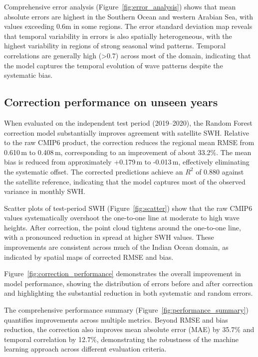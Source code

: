 \documentclass[twocolumn]{article}
\newcommand{\SI}[2]{#1\,#2}
\begin{document}
 Comprehensive error analysis (Figure~\ref{fig:error_analysis}) shows that mean absolute errors are highest in the Southern Ocean and western Arabian Sea, with values exceeding 0.6m in some regions. The error standard deviation map reveals that temporal variability in errors is also spatially heterogeneous, with the highest variability in regions of strong seasonal wind patterns. Temporal correlations are generally high (>0.7) across most of the domain, indicating that the model captures the temporal evolution of wave patterns despite the systematic bias.
 
 \subsection{Correction performance on unseen years}
 
 When evaluated on the independent test period (2019--2020), the Random Forest correction model substantially improves agreement with satellite SWH. Relative to the raw CMIP6 product, the correction reduces the regional mean RMSE from \SI{0.610}{m} to \SI{0.408}{m}, corresponding to an improvement of about 33.2\%. The mean bias is reduced from approximately \SI{+0.179}{m} to \SI{-0.013}{m}, effectively eliminating the systematic offset. The corrected predictions achieve an $R^2$ of 0.880 against the satellite reference, indicating that the model captures most of the observed variance in monthly SWH.
 
 Scatter plots of test-period SWH (Figure~\ref{fig:scatter}) show that the raw CMIP6 values systematically overshoot the one-to-one line at moderate to high wave heights. After correction, the point cloud tightens around the one-to-one line, with a pronounced reduction in spread at higher SWH values. These improvements are consistent across much of the Indian Ocean domain, as indicated by spatial maps of corrected RMSE and bias.
 
 Figure~\ref{fig:correction_performance} demonstrates the overall improvement in model performance, showing the distribution of errors before and after correction and highlighting the substantial reduction in both systematic and random errors.
 
 The comprehensive performance summary (Figure~\ref{fig:performance_summary}) quantifies improvements across multiple metrics. Beyond RMSE and bias reduction, the correction also improves mean absolute error (MAE) by 35.7\% and temporal correlation by 12.7\%, demonstrating the robustness of the machine learning approach across different evaluation criteria.
 
\end{document}
